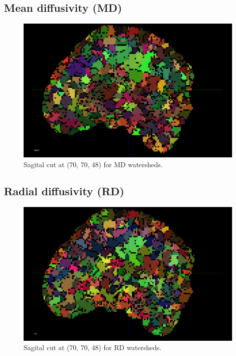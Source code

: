 \documentclass[a4paper,11pt]{report}
\begin{document}
    \subsection{Mean diffusivity (MD)}
    \begin{figure}[H]
      \includegraphics[width=1\linewidth]{imgs/md_watersheds.png}
      \caption{Sagital cut at (70, 70, 48) for MD watersheds.}
      \label{fig:md_watersheds}
    \end{figure}

    \subsection{Radial diffusivity (RD)}
    \begin{figure}[H]
      \includegraphics[width=1\linewidth]{imgs/rd_watersheds.png}
      \caption{Sagital cut at (70, 70, 48) for RD watersheds.}
      \label{fig:rd_watersheds}
    \end{figure}
\end{document}
